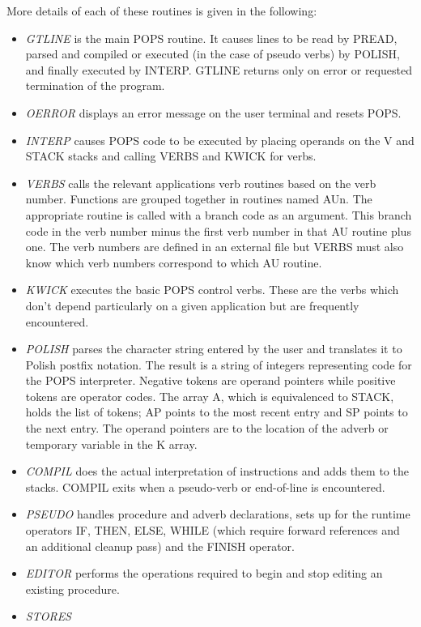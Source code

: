 More details of each of these routines is given in the following:
\begin{itemize} %
\item {\it GTLINE} is the main POPS routine.  It causes lines to be read
by PREAD, parsed and compiled or executed (in the case of pseudo
verbs) by POLISH, and finally executed by INTERP.  GTLINE returns only
on error or requested termination of the program.
\item {\it OERROR} displays an error message on the user terminal
and resets POPS.
\item {\it INTERP}
causes POPS code to be executed by placing operands on the V and STACK
stacks and calling VERBS and KWICK for verbs.
\item {\it VERBS}
calls the relevant applications verb routines based on the verb
number.  Functions are grouped together in routines named AUn.  The
appropriate routine is called with a branch code as an argument. This
branch code in the verb number minus the first verb number in that AU
routine plus one. The verb numbers are defined in an external file but
VERBS must also know which verb numbers correspond to which AU
routine.
\item {\it KWICK}
executes the basic POPS control verbs.  These are the verbs which
don't depend particularly on a given application but are frequently
encountered.
\item {\it POLISH}
parses the character string entered by the user and translates it to
Polish postfix notation.  The result is a string of integers
representing code for the POPS interpreter.  Negative tokens are
operand pointers while positive tokens are operator codes.  The array
A, which is equivalenced to STACK, holds the list of tokens; AP points
to the most recent entry and SP points to the next entry.  The operand
pointers are to the location of the adverb or temporary variable in
the K array.
\item {\it COMPIL}
does the actual interpretation of instructions and adds them to the
stacks. COMPIL exits when a pseudo-verb or end-of-line is encountered.
\item {\it PSEUDO}
handles procedure and adverb declarations, sets up for the runtime
operators IF, THEN, ELSE, WHILE (which require forward references and
an additional cleanup pass) and the FINISH operator.
\item {\it EDITOR}
performs the operations required to begin and stop editing an existing
procedure.
\item {\it STORES}

\end{itemize}
